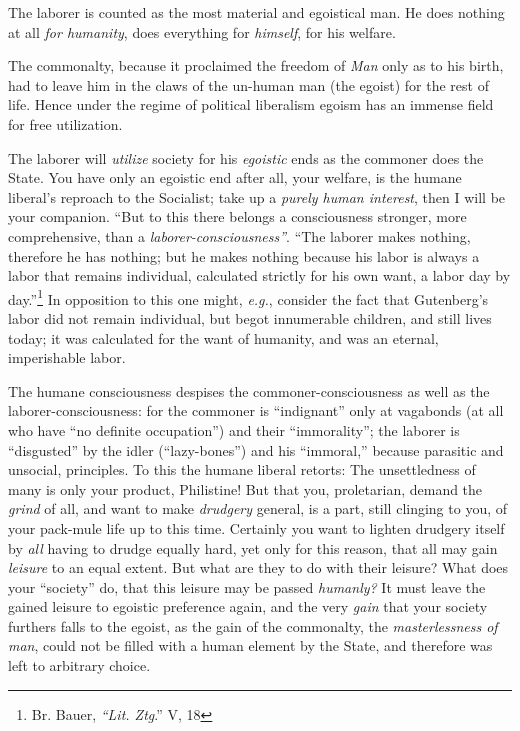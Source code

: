 \documentclass[12pt,a4paper]{book}
\begin{document}
The laborer is counted as the most material and egoistical man. He does 
nothing at all \textit{for humanity}, does everything for \textit{himself}, 
for his welfare.

The commonalty, because it proclaimed the freedom of \textit{Man} only as to 
his birth, had to leave him in the claws of the un-human man (the egoist) for 
the rest of life. Hence under the regime of political liberalism egoism has an 
immense field for free utilization.

The laborer will \textit{utilize} society for his \textit{egoistic} ends as 
the commoner does the State. You have only an egoistic end after all, your 
welfare, is the humane liberal's reproach to the Socialist; take up a 
\textit{purely human interest}, then I will be your companion. ``But to this 
there belongs a consciousness stronger, more comprehensive, than a 
\textit{laborer-consciousness''}. ``The laborer makes nothing, therefore he 
has nothing; but he makes nothing because his labor is always a labor that 
remains individual, calculated strictly for his own want, a labor day by 
day.''\footnote{Br. Bauer, \textit{``Lit. Ztg}.'' V, 18} In opposition to 
this one might, \textit{e.g.}, consider the fact that Gutenberg's labor did 
not remain individual, but begot innumerable children, and still lives today; 
it was calculated for the want of humanity, and was an eternal, imperishable 
labor.

The humane consciousness despises the commoner-consciousness as well as the 
laborer-consciousness: for the commoner is ``indignant'' only at vagabonds 
(at all who have ``no definite occupation'') and their ``immorality''; the 
laborer is ``disgusted'' by the idler (``lazy-bones'') and his 
``immoral,'' because parasitic and unsocial, principles. To this the humane 
liberal retorts: The unsettledness of many is only your product, Philistine! 
But that you, proletarian, demand the \textit{grind} of all, and want to make 
\textit{drudgery} general, is a part, still clinging to you, of your pack-mule 
life up to this time. Certainly you want to lighten drudgery itself by 
\textit{all} having to drudge equally hard, yet only for this reason, that all 
may gain \textit{leisure} to an equal extent. But what are they to do with 
their leisure? What does your ``society'' do, that this leisure may be 
passed \textit{humanly?} It must leave the gained leisure to egoistic 
preference again, and the very \textit{gain} that your society furthers falls 
to the egoist, as the gain of the commonalty, the \textit{masterlessness of 
man}, could not be filled with a human element by the State, and therefore was 
left to arbitrary choice.
\end{document}
